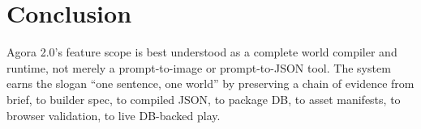 \documentclass[11pt]{article}
\begin{document}
\section{Conclusion}

Agora 2.0's feature scope is best understood as a complete world compiler and runtime, not merely a prompt-to-image or prompt-to-JSON tool. The system earns the slogan ``one sentence, one world'' by preserving a chain of evidence from brief, to builder spec, to compiled JSON, to package DB, to asset manifests, to browser validation, to live DB-backed play.
\end{document}
